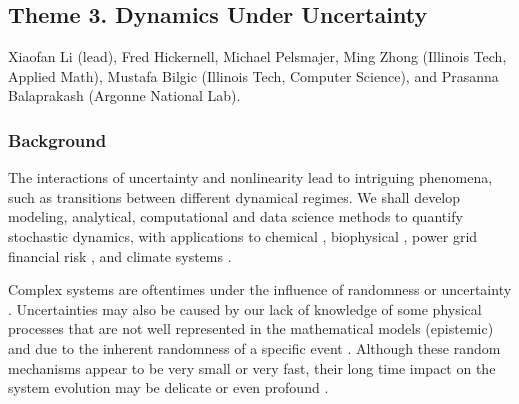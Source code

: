 \documentclass[11pt]{NSFamsart}
\begin{document}
\begin{comment}
\paragraph{Challenges \& Novelty.} 
{The challenges} for the proposed research program are both theoretical and applied.   For example, while the  Bayesian framework leads to provably better   estimation prediction in some critical cases,   it is not clear a priori how to use typical model selection criteria for networks,  due to hidden variables and model singularities.  {The novelty} of our approach lies in the interdisciplinary nature of the research program:   importing various tools from graph theory and nonlinear algebra into statistics and algorithm design for measuring goodness of fit.  
\end{comment}


\subsection*{Theme 3. Dynamics  Under Uncertainty } 
Xiaofan Li (lead), Fred Hickernell, Michael Pelsmajer, Ming Zhong (Illinois Tech, Applied Math), Mustafa Bilgic (Illinois Tech, Computer Science),  and Prasanna Balaprakash (Argonne National Lab). 

\subsubsection*{Background} The interactions of uncertainty and nonlinearity lead to intriguing phenomena, such as  transitions between  different dynamical regimes. We shall develop modeling, analytical, computational and data science  methods to quantify stochastic dynamics, with applications to chemical \cite{agaoglou_chemical_2019}, biophysical \cite{Ruoff2018BiologicalCR}, power grid \cite{MEDJROUBI201714} financial risk \cite{DixHaBil20a,Gla03}, and climate systems \cite{Alexandrov2020NonlinearCD, Franzke2017NonlinearAS, Wan2020ADF}. 
 
Complex systems are oftentimes under the influence of randomness or uncertainty \cite{Moss1, Horst, Gar, VanKampen3}. Uncertainties may also be caused by our lack of knowledge of some physical processes that are not well represented in the mathematical models (epistemic) and due to the inherent randomness of a specific event  \cite{Palmer1, Kantz, Wilks, Williams}.
Although these random mechanisms appear to be very small or very fast, their long time impact on the system evolution may be delicate or even profound \cite{Arnold, DuanBook2015}. 
\end{document}
